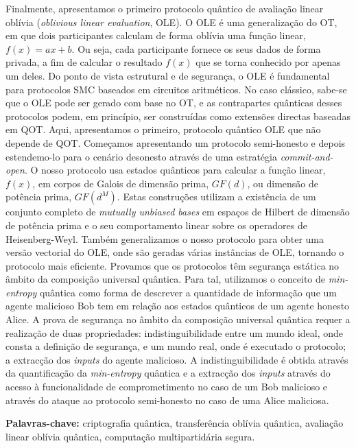 \documentclass[12pt]{report}
\begin{document}
Finalmente, apresentamos o primeiro protocolo quântico de  avaliação linear oblívia (\textit{oblivious linear evaluation}, OLE). O OLE é uma generalização do OT, em que dois participantes calculam de forma oblívia uma função linear, $f(x) = ax + b$. Ou seja, cada participante fornece os seus dados de forma privada, a fim de calcular o resultado $f(x)$ que se torna conhecido por apenas um deles. Do ponto de vista estrutural e de segurança, o OLE é fundamental para protocolos SMC baseados em circuitos aritméticos. No caso clássico, sabe-se que o OLE pode ser gerado com base no OT, e as contrapartes quânticas desses protocolos podem, em princípio, ser construídas como extensões directas baseadas em QOT. Aqui, apresentamos o primeiro, protocolo quântico OLE que não depende de QOT. Começamos apresentando um protocolo semi-honesto e depois estendemo-lo para o cenário desonesto através de uma estratégia \textit{commit-and-open}. O nosso protocolo usa estados quânticos para calcular a função linear, $f(x)$, em corpos de Galois de dimensão prima, $GF(d)$, ou dimensão de potência prima, $GF(d^M)$. Estas construções utilizam a existência de um conjunto completo de \textit{mutually unbiased bases} em espaços de Hilbert de dimensão de potência prima e o seu comportamento linear sobre os operadores de Heisenberg-Weyl. Também generalizamos o nosso protocolo para obter uma versão vectorial do OLE, onde são geradas várias instâncias de OLE, tornando o protocolo mais eficiente. Provamos que os protocolos têm segurança estática no âmbito da composição universal quântica. Para tal, utilizamos o conceito de \textit{min-entropy} quântica como forma de descrever a quantidade de informação que um agente malicioso Bob tem em relação aos estados quânticos de um agente honesto Alice. A prova de segurança no âmbito da composição universal quântica requer a realização de duas propriedades: indistinguibilidade entre um mundo ideal, onde consta a definição de segurança, e um mundo real, onde é executado o protocolo; a extracção dos \textit{inputs} do agente malicioso. A indistinguibilidade é obtida através da quantificação da \textit{min-entropy} quântica e a extracção dos \textit{inputs} através do acesso à funcionalidade de comprometimento no caso de um Bob malicioso e através do ataque ao protocolo semi-honesto no caso de uma Alice maliciosa.


\vfill
\begin{flushleft}
\textbf{Palavras-chave:} criptografia qu\^{a}ntica, transferência oblívia quântica, avaliação linear oblívia quântica, computação multipartidária segura.
\end{flushleft}
\end{document}
